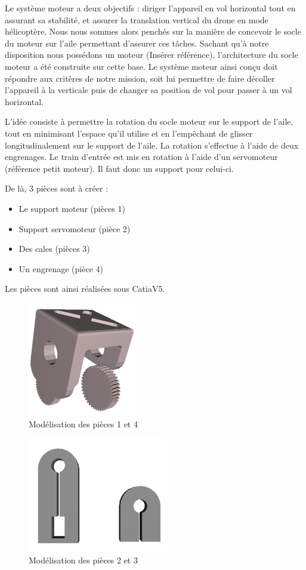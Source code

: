 \documentclass[a4paper,12pt,french]{report}
\begin{document}
Le système moteur a deux objectifs : diriger l'appareil en vol horizontal tout en assurant sa stabilité, et assurer la translation vertical du drone en mode hélicoptère. Nous nous sommes alors penchés sur la manière de concevoir le socle du moteur sur l’aile permettant d'assurer ces tâches. Sachant qu’à notre disposition nous possédons un moteur (Insérer référence), l’architecture du socle moteur a été construite sur cette base. Le système moteur ainsi conçu doit répondre aux critères de notre mission, soit lui permettre de faire décoller l’appareil à la verticale puis de changer sa position de vol pour passer à un vol horizontal. \newline

L’idée consiste à permettre la rotation du socle moteur sur le support de l’aile, tout en minimisant l’espace qu’il utilise et en l’empêchant de glisser longitudinalement sur le support de l’aile. La rotation s’effectue à l’aide de deux engrenages. Le train d’entrée est mis en rotation à l’aide d’un servomoteur (référence petit moteur). Il faut donc un support pour celui-ci.\newline

De là, 3 pièces sont à créer :
\begin{itemize}
    \item Le support moteur (pièces 1)
    \item Support servomoteur (pièce 2)
    \item Des cales (pièces 3)
    \item Un engrenage (pièce 4)
\end{itemize}

Les pièces sont ainsi réalisées sous CatiaV5.

\begin{figure}[h]
    \centering
    \includegraphics[height=5cm]{figures/mot1.png}
    \caption{Modélisation des pièces 1 et 4}
\end{figure}

\begin{figure}[h]
    \centering
    \includegraphics[height=5cm]{figures/mot2.png}
    \caption{Modélisation des pièces 2 et 3}
\end{figure}
\end{document}
